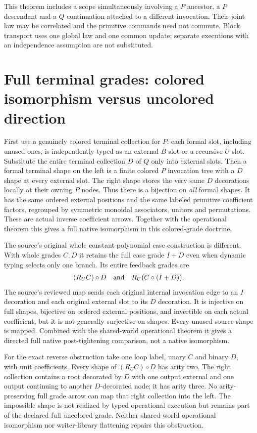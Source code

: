 \documentclass[11pt]{article}
\begin{document}
This theorem includes a scope simultaneously involving a $P$ ancestor, a $P$ descendant and a $Q$ continuation attached to a different invocation. Their joint law may be correlated and the primitive commands need not commute. Block transport uses one global law and one common update; separate executions with an independence assumption are not substituted.

\section{Full terminal grades: colored isomorphism versus uncolored direction}
First use a genuinely colored terminal collection for $P$: each formal slot, including unused ones, is independently typed as an external $B$ slot or a recursive $U$ slot. Substitute the entire terminal collection $D$ of $Q$ only into external slots. Then a formal terminal shape on the left is a finite colored $P$ invocation tree with a $D$ shape at every external slot. The right shape stores the very same $D$ decorations locally at their owning $P$ nodes. Thus there is a bijection on \emph{all} formal shapes. It has the same ordered external positions and the same labeled primitive coefficient factors, regrouped by symmetric monoidal associators, unitors and permutations. These are actual inverse coefficient arrows. Together with the operational theorem this gives a full native isomorphism in this colored-grade doctrine.

The source's original whole constant-polynomial case construction is different. With whole grades $C,D$ it retains the full case grade $I+D$ even when dynamic typing selects only one branch. Its entire feedback grades are
\[
 (R_UC)\circ D\quad\hbox{and}\quad R_U(C\circ(I+D)).
\]
The source's reviewed map sends each original internal invocation edge to an $I$ decoration and each original external slot to its $D$ decoration. It is injective on full shapes, bijective on ordered external positions, and invertible on each actual coefficient, but it is not generally surjective on shapes. Every unused source shape is mapped. Combined with the shared-world operational theorem it gives a directed full native post-tightening comparison, not a native isomorphism.

For the exact reverse obstruction take one loop label, unary $C$ and binary $D$, with unit coefficients. Every shape of $(R_UC)\circ D$ has arity two. The right collection contains a root decorated by $D$ with one output external and one output continuing to another $D$-decorated node; it has arity three. No arity-preserving full grade arrow can map that right collection into the left. The impossible shape is not realized by typed operational execution but remains part of the declared full uncolored grade. Neither shared-world operational isomorphism nor writer-library flattening repairs this obstruction.
\end{document}
